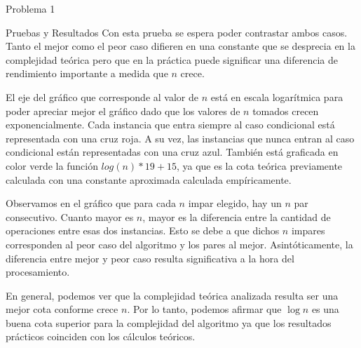 \begin{section}{Problema 1}
\begin{subsection}{Pruebas y Resultados}
	Con esta prueba se espera poder contrastar ambos casos. Tanto el mejor como el peor caso difieren en una constante que se desprecia en la complejidad teórica pero que en la práctica puede significar una diferencia de rendimiento importante a medida que $n$ crece.

El eje del gráfico que corresponde al valor de $n$ está en escala logarítmica para poder apreciar mejor el gráfico dado que los valores de $n$ tomados crecen exponencialmente. Cada instancia que entra siempre al caso condicional está representada con una cruz roja. A su vez, las instancias que nunca entran al caso condicional están representadas con una cruz azul. También está graficada en color verde la función $log(n)*19+15$, ya que es la cota teórica previamente calculada con una constante aproximada calculada empíricamente. \\
		\VSP

Observamos en el gráfico que para cada $n$ impar elegido, hay un $n$ par consecutivo. Cuanto mayor es $n$, mayor es la diferencia entre la cantidad de operaciones entre esas dos instancias. Esto se debe a que dichos $n$ impares corresponden al peor caso del algoritmo y los pares al mejor. Asintóticamente, la diferencia entre mejor y peor caso resulta significativa a la hora del procesamiento.

		En general, podemos ver que la complejidad teórica analizada resulta ser una mejor cota conforme crece $n$. Por lo tanto, podemos afirmar que $\log n$ es una buena cota superior para la complejidad del algoritmo ya que los resultados prácticos coinciden con los cálculos teóricos.
	\end{subsection}

\end{section}

